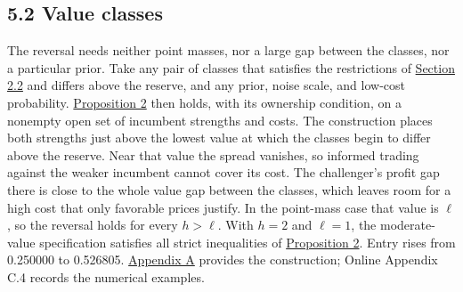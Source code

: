 \subsection{5.2 Value classes}\label{sec-acquisition-values}

The reversal needs neither point masses, nor a large gap between the
classes, nor a particular prior. Take any pair of classes that satisfies
the restrictions of
\hyperref[sec-values-preparation-and-the-sale]{Section 2.2} and differs
above the reserve, and any prior, noise scale, and low-cost probability.
\hyperref[result-proposition-2]{Proposition 2} then holds, with its
ownership condition, on a nonempty open set of incumbent strengths and
costs. The construction places both strengths just above the lowest
value at which the classes begin to differ above the reserve. Near that
value the spread vanishes, so informed trading against the weaker
incumbent cannot cover its cost. The challenger's profit gap there is
close to the whole value gap between the classes, which leaves room for
a high cost that only favorable prices justify. In the point-mass case
that value is \(\ell\), so the reversal holds for every \(h>\ell\). With
\(h=2\) and \(\ell=1\), the moderate-value specification satisfies all
strict inequalities of \hyperref[result-proposition-2]{Proposition 2}.
Entry rises from 0.250000 to 0.526805.
\hyperref[paper-appendix]{Appendix A} provides the construction; Online
Appendix C.4 records the numerical examples.

